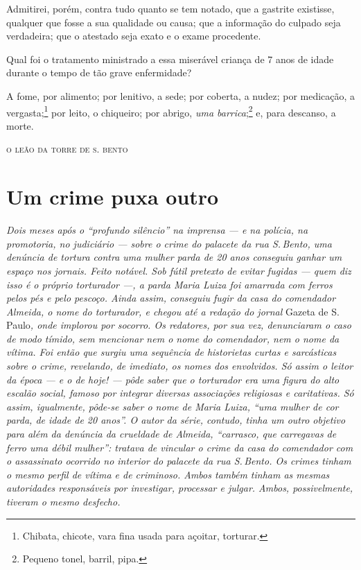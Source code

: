 Admitirei, porém, contra tudo quanto se tem notado, que a gastrite
existisse, qualquer que fosse a sua qualidade ou causa; que a informação
do culpado seja verdadeira; que o atestado seja exato e o exame
procedente.

Qual foi o tratamento ministrado a essa miserável criança de 7 anos de
idade durante o tempo de tão grave enfermidade?

A fome, por alimento; por lenitivo, a sede; por coberta, a nudez; por
medicação, a vergasta;\footnote{Chibata, chicote, vara fina usada para
  açoitar, torturar.} por leito, o chiqueiro; por abrigo, \emph{uma
barrica};\footnote{Pequeno tonel, barril, pipa.} e, para descanso, a morte.

\medskip
\hfill\textsc{o leão da torre de s. bento}

\part{Um crime puxa outro}

\begin{didas}
\emph{Dois meses após o ``profundo silêncio'' na imprensa --- e na polícia,
na promotoria, no judiciário --- sobre o crime do palacete da rua S.\,Bento,
uma denúncia de tortura contra uma mulher parda de 20 anos
conseguiu ganhar um espaço nos jornais. Feito notável. Sob fútil
pretexto de evitar fugidas --- quem diz isso é o próprio torturador ---, a
parda Maria Luiza foi amarrada com ferros pelos pés e pelo pescoço.
Ainda assim, conseguiu fugir da casa do comendador Almeida, o nome do
torturador, e chegou até a redação do jornal} Gazeta de S.\,Paulo\emph{,
onde implorou por socorro. Os redatores, por sua vez, denunciaram o caso
de modo tímido, sem mencionar nem o nome do comendador, nem o nome da
vítima. Foi então que surgiu uma sequência de historietas curtas e
sarcásticas sobre o crime, revelando, de imediato, os nomes dos
envolvidos. Só assim o leitor da época --- e o de hoje! --- pôde saber que
o torturador era uma figura do alto escalão social, famoso por integrar
diversas associações religiosas e caritativas. Só assim, igualmente,
pôde-se saber o nome de Maria Luiza, ``uma mulher de cor parda, de idade
de 20 anos''. O autor da série, contudo, tinha um outro objetivo para
além da denúncia da crueldade de Almeida, ``carrasco, que carregavas de
ferro uma débil mulher'': tratava de vincular o crime da casa do
comendador com o assassinato ocorrido no interior do palacete da rua S.\,Bento. Os crimes tinham o mesmo perfil de vítima e de criminoso. Ambos
também tinham as mesmas autoridades responsáveis por investigar,
processar e julgar. Ambos, possivelmente, tiveram o mesmo desfecho. }
\end{didas}

